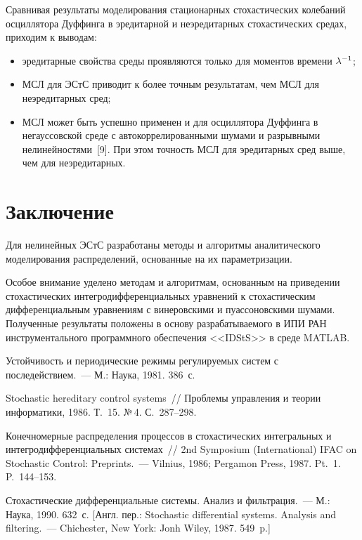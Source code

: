 \begin{multicols}{2}
Сравнивая результаты моделирования стационарных стохастических колебаний осциллятора 
Дуффинга в эредитарной и неэредитарных стохастических средах, приходим к выводам:
\begin{itemize}
\item эредитарные свойства среды проявляются только для моментов времени $\lambda^{-1}$;
\item  МСЛ для ЭСтС приводит к более точным результатам, чем МСЛ для неэредитарных сред;
\item  МСЛ может быть успешно применен и для осциллятора Дуффинга в негауссовской среде с 
автокоррелированными шумами и разрывными нелинейностями~[9]. При этом точность 
МСЛ для эредитарных сред выше, чем для неэредитарных.
\end{itemize}


\section{Заключение}

Для нелинейных ЭСтС разработаны методы и алгоритмы аналитического моделирования 
распределений, основанные на их параметризации.

Особое внимание уделено методам и алгоритмам, основанным на приведении стохастических 
интегродифференциальных уравнений к стохастическим дифференциальным уравнениям с 
винеровскими и пуассоновскими шумами.
Полученные результаты положены в основу разрабатываемого в ИПИ РАН инструментального 
программного обеспечения <<IDStS>> в среде MATLAB.

{\small\frenchspacing
{%
\begin{thebibliography}{9}
Устойчивость и периодические режимы регулируемых систем с последействием.~--- М.: Наука, 1981.
386~с.

Stochastic hereditary control systems~// Проблемы управления и теории информатики, 1986. 
Т.~15. №\,4. С.~287--298.

Конечномерные распределения процессов в стохастических интегральных и 
интегродифференциальных сис\-те\-мах~// 2nd  Symposium (International) 
IFAC on Stochastic Control: Preprints.~--- Vilnius, 1986; Pergamon Press, 1987. 
Pt.~1. P.~144--153.

Стохастические дифференциальные системы. Анализ и фильтрация.~--- 
М.: Наука,  1990. 632~с.
[Англ. пер.: Stochastic differential systems. Analysis and filtering.~--- 
Chichester, New York: Jonh Wiley, 1987. 549~p.]


\end{thebibliography}}}
\end{multicols}
